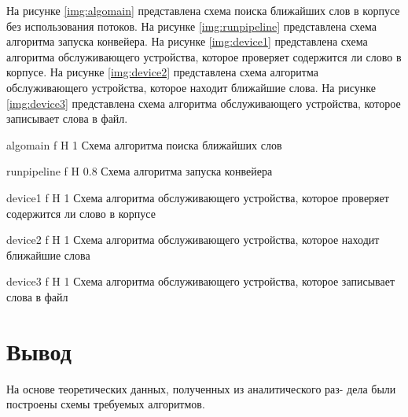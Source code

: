 На рисунке \ref{img:algomain} представлена схема поиска ближайших слов в корпусе без использования потоков. 
На рисунке \ref{img:runpipeline} представлена схема алгоритма запуска конвейера. 
На рисунке \ref{img:device1} представлена схема алгоритма обслуживающего устройства, которое проверяет содержится ли слово в корпусе. 
На рисунке \ref{img:device2} представлена схема алгоритма обслуживающего устройства, которое находит ближайшие слова. 
На рисунке \ref{img:device3} представлена схема алгоритма обслуживающего устройства, которое записывает слова в файл. 


{algomain} %
{f} %
{H} %
{1\textwidth} %
{Схема алгоритма поиска ближайших слов} %


{runpipeline} %
{f} %
{H} %
{0.8\textwidth} %
{Схема алгоритма запуска конвейера} %


{device1} %
{f} %
{H} %
{1\textwidth} %
{Схема алгоритма обслуживающего устройства, которое проверяет содержится ли слово в корпусе} %

{device2} %
{f} %
{H} %
{1\textwidth} %
{Схема алгоритма обслуживающего устройства, которое находит ближайшие слова} %

{device3} %
{f} %
{H} %
{1\textwidth} %
{Схема алгоритма обслуживающего устройства, которое записывает слова в файл} %


\section*{Вывод}
На основе теоретических данных, полученных из аналитического раз-
дела были построены схемы требуемых алгоритмов. 